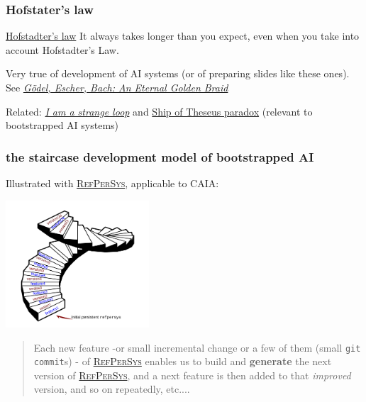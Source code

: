 \documentclass[xcolor=svgnames,final,smaller,a4]{beamer}
\newcommand{\RefPerSys}{\href{http://refpersys.org}{\textsc{RefPerSys}}}
\begin{document}
 \begin{frame}
   \frametitle{Hofstater's law}

   \begin{block}{\href{https://en.wikipedia.org/wiki/Hofstadter's_law}{Hofstadter's law}}
     It always takes longer than you expect, even when you take into account Hofstadter's Law.
   \end{block}

   Very true of development of AI systems (or of preparing slides like
   these ones). See
   \href{https://en.wikipedia.org/wiki/Gödel,_Escher,_Bach}{\textit{Gödel,
       Escher, Bach: An Eternal Golden Braid}}

   \bigskip

   Related:
   \href{https://en.wikipedia.org/wiki/I_Am_a_Strange_Loop}{\textit{I
       am a strange loop}} and
   \href{https://en.wikipedia.org/wiki/Ship_of_Theseus}{Ship of
     Theseus paradox} (relevant to bootstrapped AI systems)
   
 \end{frame}

 \begin{frame}
   \frametitle{the staircase development model of bootstrapped AI}

   Illustrated with \RefPerSys, applicable to CAIA:

   \begin{center}
     \includegraphics[width=0.4\textwidth]{spiral-stairs}
   \end{center}

   \smallskip
   

  \begin{quote}
    \begin{relsize}{-0.5}
    Each new feature -or small incremental change or a few of them
    (small \texttt{git commit}s) - of {\RefPerSys} enables us to build
    and \textbf{generate} the next version of {\RefPerSys}, and a next
    feature is then added to that \textit{improved} version, and so on
    repeatedly, etc....
    \end{relsize}
  \end{quote}
   
 \end{frame}
 
\end{document}
